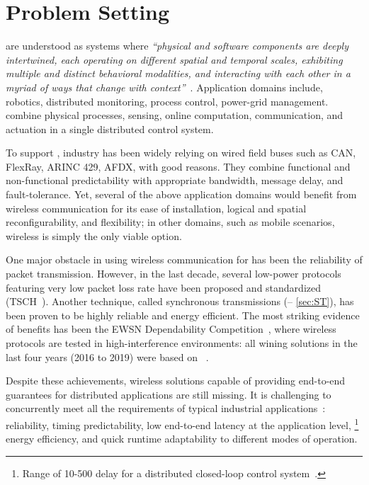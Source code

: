 
\section{Problem Setting}
\label{sec:ttw_intro}


\cps are understood as systems where \emph{``physical and software components are deeply intertwined, each operating on different spatial and temporal scales, exhibiting multiple and distinct behavioral modalities, and interacting with each other in a myriad of ways that change with context''}~\cite{nsf2010Cyber}.
Application domains include, \eg robotics, distributed monitoring, process control, power-grid management.
\cps combine physical processes, sensing, online computation, communication, and actuation in a single distributed control system.

To support \cps, industry has been widely relying on wired field buses such as CAN, FlexRay, ARINC 429, AFDX, with good reasons. They combine functional and non-functional predictability with appropriate bandwidth, message delay, and fault-tolerance.
Yet, several of the above application domains would benefit from wireless communication for its ease of installation, logical and spatial reconfigurability, and flexibility; in other domains, such as mobile scenarios, wireless is simply the only viable option.

\pagebreak

One major obstacle in using wireless communication for \CPS has been the reliability of packet transmission.
However, in the last decade, several low-power protocols featuring very low packet loss rate have been proposed and standardized (\eg TSCH~\cite{watteyne2017Teaching}).
Another technique, called synchronous transmissions (\ST -- \cref{sec:ST}), has been proven to be highly reliable and energy efficient.
The most striking evidence of \ST benefits has been the EWSN Dependability Competition~\cite{schuss2017Competition}, where wireless protocols are tested in high-interference environments: all wining solutions in the last four years (2016 to 2019) were based on \ST~\cite{escobar2018Competition,sommer2016Competition,lim2017Competition, escobar2019RedNodeBus, ma2019DeCoT}.

Despite these achievements, wireless \CPS solutions capable of providing end-to-end guarantees for distributed applications are still missing.
It is challenging to concurrently meet all the requirements of typical industrial applications~\cite{akerberg2011Future}: reliability, timing predictability, low end-to-end latency at the application level,%
%
\footnote{Range of 10-500 \ms delay for a distributed closed-loop control system~\cite{akerberg2011Future}.}
%
energy efficiency, and quick runtime adaptability to different modes of operation.

